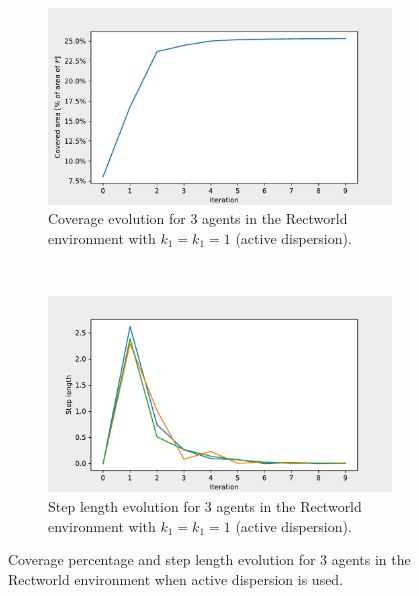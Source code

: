 \begin{figure}[H]
  \centering
  \begin{subfigure}[t]{0.5\textwidth}
    \centering
    \includegraphics[width=\textwidth]{figs/bigworld_3_agnt_k_1_1_k_2_1_area_traj.pdf}
    \caption{Coverage evolution for 3 agents in the Rectworld environment with $k_{1} = k_{1} = 1$ (active dispersion).}
    \label{fig:3_agnt_bw_k_1_1_a_traj}
  \end{subfigure}%
  ~ 
  \begin{subfigure}[t]{0.5\textwidth}
    \centering
    \includegraphics[width=\textwidth]{figs/bigworld_3_agnt_k_1_1_k_2_1_step_traj.pdf}
    \caption{Step length evolution for 3 agents in the Rectworld environment with $k_{1} = k_{1} = 1$ (active dispersion).}
    \label{fig:3_agnt_bw_k_1_1_s_traj}
  \end{subfigure}
  \caption{Coverage percentage and step length evolution for 3 agents in the Rectworld environment when active dispersion is used.}
  \label{fig:3_agnt_bw_evolution_active}
\end{figure}


